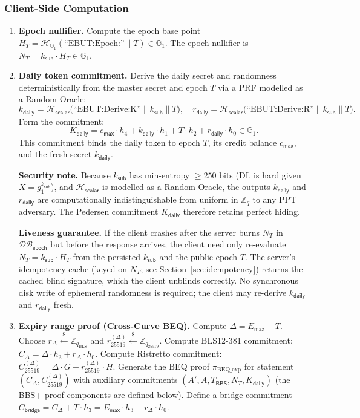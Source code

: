 \documentclass[11pt]{article}
\theoremstyle{definitionstyle}
\theoremstyle{plain}
\newcommand{\DB}{\mathcal{DB}}
\begin{document}
\subsubsection{Client-Side Computation}
\begin{enumerate}[leftmargin=*]
\item \textbf{Epoch nullifier.}
  Compute the epoch base point $H_T = \mathcal{H}_{\mathbb{G}_1}(\text{``EBUT:Epoch:''} \parallel T) \in \mathbb{G}_1$.
  The epoch nullifier is $N_T = k_{\mathsf{sub}} \cdot H_T \in \mathbb{G}_1$.
\item \textbf{Daily token commitment.}
  Derive the daily secret and randomness deterministically from the master secret and epoch $T$ via a PRF modelled as a Random Oracle:
  \[
  k_{\mathsf{daily}} = \mathcal{H}_{\mathsf{scalar}}\!\bigl(\text{``EBUT:Derive:K''} \parallel k_{\mathsf{sub}} \parallel T\bigr), \quad
  r_{\mathsf{daily}} = \mathcal{H}_{\mathsf{scalar}}\!\bigl(\text{``EBUT:Derive:R''} \parallel k_{\mathsf{sub}} \parallel T\bigr).
  \]
  Form the commitment:
  \[
  K_{\mathsf{daily}} = c_{\mathsf{max}} \cdot h_4 + k_{\mathsf{daily}} \cdot h_1 + T \cdot h_2 + r_{\mathsf{daily}} \cdot h_0 \in \mathbb{G}_1.
  \]
  This commitment binds the daily token to epoch $T$, its credit balance $c_{\mathsf{max}}$, and the fresh secret $k_{\mathsf{daily}}$.

  \textbf{Security note.}
  Because $k_{\mathsf{sub}}$ has min-entropy $\ge 250$ bits (DL is hard given $X = g_1^{k_{\mathsf{sub}}}$), and $\mathcal{H}_{\mathsf{scalar}}$ is modelled as a Random Oracle, the outputs $k_{\mathsf{daily}}$ and $r_{\mathsf{daily}}$ are computationally indistinguishable from uniform in $\mathbb{Z}_q$ to any PPT adversary.  The Pedersen commitment $K_{\mathsf{daily}}$ therefore retains perfect hiding.

  \textbf{Liveness guarantee.}
  If the client crashes after the server burns $N_T$ in $\DB_{\mathsf{epoch}}$ but before the response arrives, the client need only re-evaluate $N_T = k_{\mathsf{sub}} \cdot H_T$ from the persisted $k_{\mathsf{sub}}$ and the public epoch $T$.  The server's idempotency cache (keyed on $N_T$; see Section~\ref{sec:idempotency}) returns the cached blind signature, which the client unblinds correctly.  No synchronous disk write of ephemeral randomness is required; the client may re-derive $k_{\mathsf{daily}}$ and $r_{\mathsf{daily}}$ fresh.

\item \textbf{Expiry range proof (Cross-Curve BEQ).}
  Compute $\Delta = E_{\mathsf{max}} - T$.
  Choose $r_{\Delta} \xleftarrow{\$} \mathbb{Z}_{q_{\text{BLS}}}$ and $r_{25519}^{(\Delta)} \xleftarrow{\$} \mathbb{Z}_{q_{25519}}$.
  Compute BLS12-381 commitment: $C_{\Delta} = \Delta \cdot h_3 + r_{\Delta} \cdot h_0$.
  Compute Ristretto commitment: $C_{25519}^{(\Delta)} = \Delta \cdot G + r_{25519}^{(\Delta)} \cdot H$.
  Generate the BEQ proof $\pi_{\text{BEQ\_exp}}$ for statement $(C_{\Delta}, C_{25519}^{(\Delta)})$ with auxiliary commitments $(A', \bar{A}, T_{\mathsf{BBS}}, N_T, K_{\mathsf{daily}})$ (the BBS+ proof components are defined below).
  Define a bridge commitment $C_{\mathsf{bridge}} = C_{\Delta} + T \cdot h_3 = E_{\mathsf{max}} \cdot h_3 + r_{\Delta} \cdot h_0$.
\end{enumerate}
\end{document}

